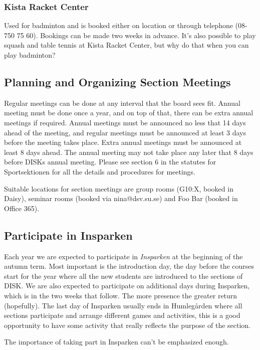 \documentclass[12pt,a4paper]{article}
\begin{document}
			\subsubsection{Kista Racket Center}
			Used for badminton and is booked either on location or through telephone (08-750 75 60). Bookings can be made two weeks in advance. It's also possible to play squash and table tennis at Kista Racket Center, but why do that when you can play badminton?
		\subsection{Planning and Organizing Section Meetings}
		Regular meetings can be done at any interval that the board sees fit. Annual meeting must be done once a year, and on top of that, there can be extra annual meetings if required. Annual meetings must be announced no less that 14 days ahead of the meeting, and regular meetings must be announced at least 3 days before the meeting takes place. Extra annual meetings must be announced at least 8 days ahead. The annual meeting may not take place any later that 8 days before DISKs annual meeting. Please see section 6 in the statutes for Sportsektionen for all the details and procedures for meetings.

		Suitable locations for section meetings are group rooms (G10:X, booked in Daisy), seminar rooms (booked via nina@dsv.su.se) and Foo Bar (booked in Office 365).
		\subsection{Participate in Insparken}
		Each year we are expected to participate in \emph{Insparken} at the beginning of the autumn term. Most important is the introduction day, the day before the courses start for the year where all the new students are introduced to the sections of DISK. We are also expected to participate on additional days during Insparken, which is in the two weeks that follow. The more presence the greater return (hopefully). The last day of Insparken usually ends in Humlegården where all sections participate and arrange different games and activities, this is a good opportunity to have some activity that really reflects the purpose of the section.

		The importance of taking part in Insparken can't be emphasized enough.
\end{document}
